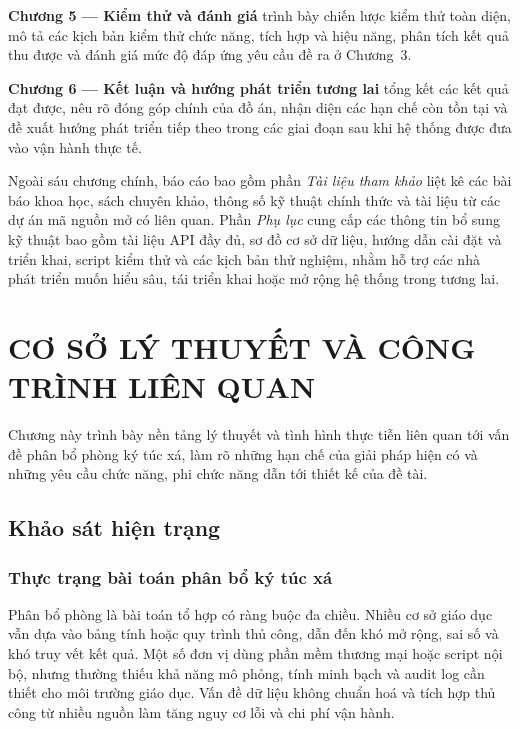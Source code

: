\documentclass[a4paper,12pt,openany,oneside]{report}
\begin{document}
\textbf{Chương 5 --- Kiểm thử và đánh giá} trình bày chiến lược kiểm thử toàn
diện, mô tả các kịch bản kiểm thử chức năng, tích hợp và hiệu năng, phân tích
kết quả thu được và đánh giá mức độ đáp ứng yêu cầu đề ra ở Chương~3.

\textbf{Chương 6 --- Kết luận và hướng phát triển tương lai} tổng kết các kết
quả đạt được, nêu rõ đóng góp chính của đồ án, nhận diện các hạn chế còn tồn
tại và đề xuất hướng phát triển tiếp theo trong các giai đoạn sau khi hệ thống
được đưa vào vận hành thực tế.

Ngoài sáu chương chính, báo cáo bao gồm phần \textit{Tài liệu tham khảo} liệt
kê các bài báo khoa học, sách chuyên khảo, thông số kỹ thuật chính thức và tài
liệu từ các dự án mã nguồn mở có liên quan. Phần \textit{Phụ lục} cung cấp các
thông tin bổ sung kỹ thuật bao gồm tài liệu API đầy đủ, sơ đồ cơ sở dữ liệu,
hướng dẫn cài đặt và triển khai, script kiểm thử và các kịch bản thử nghiệm,
nhằm hỗ trợ các nhà phát triển muốn hiểu sâu, tái triển khai hoặc mở rộng hệ
thống trong tương lai.

\clearpage
\chapter{CƠ SỞ LÝ THUYẾT VÀ CÔNG TRÌNH LIÊN QUAN}

Chương này trình bày nền tảng lý thuyết và tình hình thực tiễn liên quan tới
vấn đề phân bổ phòng ký túc xá, làm rõ những hạn chế của giải pháp hiện có và
những yêu cầu chức năng, phi chức năng dẫn tới thiết kế của đề tài.

\section{Khảo sát hiện trạng}
\label{sec:survey}

\subsection{Thực trạng bài toán phân bổ ký túc xá}

Phân bổ phòng là bài toán tổ hợp có ràng buộc đa chiều. Nhiều cơ sở giáo dục
vẫn dựa vào bảng tính hoặc quy trình thủ công, dẫn đến khó mở rộng, sai số và
khó truy vết kết quả. Một số đơn vị dùng phần mềm thương mại hoặc script nội
bộ, nhưng thường thiếu khả năng mô phỏng, tính minh bạch và audit log cần thiết
cho môi trường giáo dục. Vấn đề dữ liệu không chuẩn hoá và tích hợp thủ công từ
nhiều nguồn làm tăng nguy cơ lỗi và chi phí vận hành.
\end{document}
